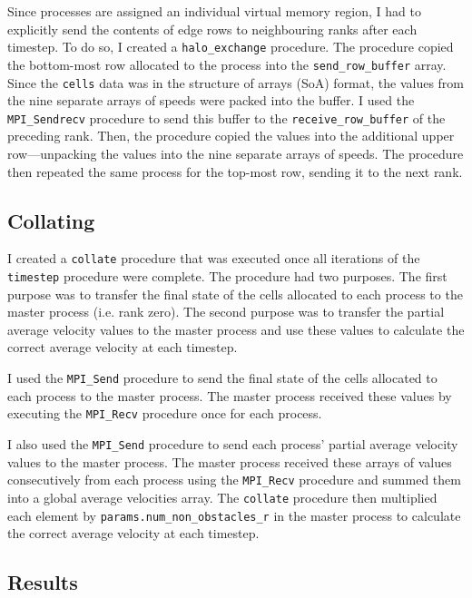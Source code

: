 \documentclass[twocolumn, a4paper]{article}
\begin{document}
Since processes are assigned an individual virtual memory region, I had to explicitly send the contents of edge rows to neighbouring ranks after each timestep.
To do so, I created a \texttt{halo\_exchange} procedure.
The procedure copied the bottom-most row allocated to the process into the \texttt{send\_row\_buffer} array.
Since the \texttt{cells} data was in the structure of arrays (SoA) format, the values from the nine separate arrays of speeds were packed into the buffer.
I used the \texttt{MPI\_Sendrecv} procedure to send this buffer to the \texttt{receive\_row\_buffer} of the preceding rank.
Then, the procedure copied the values into the additional upper row---unpacking the values into the nine separate arrays of speeds.
The procedure then repeated the same process for the top-most row, sending it to the next rank.

\subsection{Collating}

I created a \texttt{collate} procedure that was executed once all iterations of the \texttt{timestep} procedure were complete.
The procedure had two purposes.
The first purpose was to transfer the final state of the cells allocated to each process to the master process (i.e. rank zero).
The second purpose was to transfer the partial average velocity values to the master process and use these values to calculate the correct average velocity at each timestep.

I used the \texttt{MPI\_Send} procedure to send the final state of the cells allocated to each process to the master process.
The master process received these values by executing the \texttt{MPI\_Recv} procedure once for each process.

I also used the \texttt{MPI\_Send} procedure to send each process' partial average velocity values to the master process.
The master process received these arrays of values consecutively from each process using the \texttt{MPI\_Recv} procedure and summed them into a global average velocities array.
The \texttt{collate} procedure then multiplied each element by \texttt{params.num\_non\_obstacles\_r} in the master process to calculate the correct average velocity at each timestep.

\subsection{Results}
\end{document}
